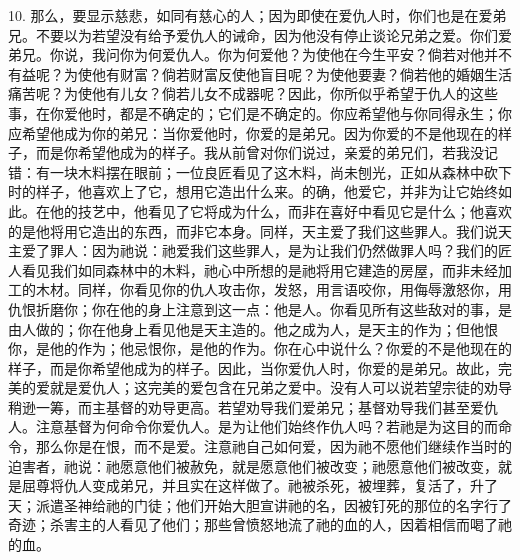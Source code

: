 10. 那么，要显示慈悲，如同有慈心的人；因为即使在爱仇人时，你们也是在爱弟兄。不要以为若望没有给予爱仇人的诫命，因为他没有停止谈论兄弟之爱。你们爱弟兄。你说，我问你为何爱仇人。你为何爱他？为使他在今生平安？倘若对他并不有益呢？为使他有财富？倘若财富反使他盲目呢？为使他要妻？倘若他的婚姻生活痛苦呢？为使他有儿女？倘若儿女不成器呢？因此，你所似乎希望于仇人的这些事，在你爱他时，都是不确定的；它们是不确定的。你应希望他与你同得永生；你应希望他成为你的弟兄：当你爱他时，你爱的是弟兄。因为你爱的不是他现在的样子，而是你希望他成为的样子。我从前曾对你们说过，亲爱的弟兄们，若我没记错：有一块木料摆在眼前；一位良匠看见了这木料，尚未刨光，正如从森林中砍下时的样子，他喜欢上了它，想用它造出什么来。的确，他爱它，并非为让它始终如此。在他的技艺中，他看见了它将成为什么，而非在喜好中看见它是什么；他喜欢的是他将用它造出的东西，而非它本身。同样，天主爱了我们这些罪人。我们说天主爱了罪人：因为祂说：祂爱我们这些罪人，是为让我们仍然做罪人吗？我们的匠人看见我们如同森林中的木料，祂心中所想的是祂将用它建造的房屋，而非未经加工的木材。同样，你看见你的仇人攻击你，发怒，用言语咬你，用侮辱激怒你，用仇恨折磨你；你在他的身上注意到这一点：他是人。你看见所有这些敌对的事，是由人做的；你在他身上看见他是天主造的。他之成为人，是天主的作为；但他恨你，是他的作为；他忌恨你，是他的作为。你在心中说什么？你爱的不是他现在的样子，而是你希望他成为的样子。因此，当你爱仇人时，你爱的是弟兄。故此，完美的爱就是爱仇人；这完美的爱包含在兄弟之爱中。没有人可以说若望宗徒的劝导稍逊一筹，而主基督的劝导更高。若望劝导我们爱弟兄；基督劝导我们甚至爱仇人。注意基督为何命令你爱仇人。是为让他们始终作仇人吗？若祂是为这目的而命令，那么你是在恨，而不是爱。注意祂自己如何爱，因为祂不愿他们继续作当时的迫害者，祂说：祂愿意他们被赦免，就是愿意他们被改变；祂愿意他们被改变，就是屈尊将仇人变成弟兄，并且实在这样做了。祂被杀死，被埋葬，复活了，升了天；派遣圣神给祂的门徒；他们开始大胆宣讲祂的名，因被钉死的那位的名字行了奇迹；杀害主的人看见了他们；那些曾愤怒地流了祂的血的人，因着相信而喝了祂的血。\par

